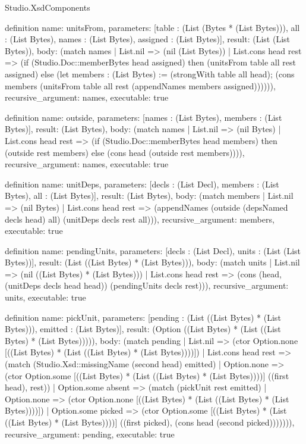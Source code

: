\begin{lexlean}{Studio.XsdComponents}
\begin{semanticmodule}
definition{
  name: unitsFrom,
  parameters: [table : (List (Bytes * (List Bytes))), all : (List Bytes), names : (List Bytes), assigned : (List Bytes)],
  result: (List (List Bytes)),
  body: (match names
    | List.nil => (nil (List Bytes))
    | List.cons head rest => (if (Studio.Doc::memberBytes head assigned) then (unitsFrom table all rest assigned) else (let members : (List Bytes) := (strongWith table all head); (cons members (unitsFrom table all rest (appendNames members assigned)))))),
  recursive_argument: names,
  executable: true
}

definition{
  name: outside,
  parameters: [names : (List Bytes), members : (List Bytes)],
  result: (List Bytes),
  body: (match names
    | List.nil => (nil Bytes)
    | List.cons head rest => (if (Studio.Doc::memberBytes head members) then (outside rest members) else (cons head (outside rest members)))),
  recursive_argument: names,
  executable: true
}

definition{
  name: unitDeps,
  parameters: [decls : (List Decl), members : (List Bytes), all : (List Bytes)],
  result: (List Bytes),
  body: (match members
    | List.nil => (nil Bytes)
    | List.cons head rest => (appendNames (outside (depsNamed decls head) all) (unitDeps decls rest all))),
  recursive_argument: members,
  executable: true
}

definition{
  name: pendingUnits,
  parameters: [decls : (List Decl), units : (List (List Bytes))],
  result: (List ((List Bytes) * (List Bytes))),
  body: (match units
    | List.nil => (nil ((List Bytes) * (List Bytes)))
    | List.cons head rest => (cons (head, (unitDeps decls head head)) (pendingUnits decls rest))),
  recursive_argument: units,
  executable: true
}

definition{
  name: pickUnit,
  parameters: [pending : (List ((List Bytes) * (List Bytes))), emitted : (List Bytes)],
  result: (Option ((List Bytes) * (List ((List Bytes) * (List Bytes))))),
  body: (match pending
    | List.nil => (ctor Option.none [((List Bytes) * (List ((List Bytes) * (List Bytes))))])
    | List.cons head rest => (match (Studio.Xsd::missingName (second head) emitted)
      | Option.none => (ctor Option.some [((List Bytes) * (List ((List Bytes) * (List Bytes))))] ((first head), rest))
      | Option.some absent => (match (pickUnit rest emitted)
        | Option.none => (ctor Option.none [((List Bytes) * (List ((List Bytes) * (List Bytes))))])
        | Option.some picked => (ctor Option.some [((List Bytes) * (List ((List Bytes) * (List Bytes))))] ((first picked), (cons head (second picked))))))),
  recursive_argument: pending,
  executable: true
}


\end{semanticmodule}
\end{lexlean}
